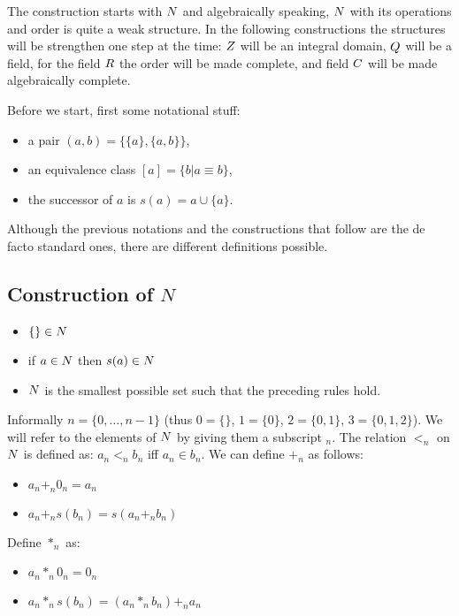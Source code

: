 The construction starts with $N$ and algebraically speaking, $N$ with its
operations and order is quite a weak structure. In the following constructions
the structures will be strengthen one step at the time: $Z$ will be an
integral domain, $Q$ will be a field, for the field $R$ the order will be
made complete, and field $C$ will be made algebraically complete.
%
%

Before we start, first some notational stuff:
\begin{itemize}
\item a pair $(a,b) = \{\{a\},\{a,b\}\}$,
\item an equivalence class $[a] = \{b | a \equiv b\}$,
\item the successor of $a$ is $s(a) = a \cup \{a\}$.
\end{itemize}
Although the previous notations and the constructions that follow are the de
facto standard ones, there are different definitions possible.

\subsection{Construction of \sl $N$}

\begin{itemize}
\item $\{\} \in N$
\item if $a \in N$ then $s(a) \in N$
\item $N$ is the smallest possible set such that the preceding rules hold.
\end{itemize}
Informally $n=\{0,\ldots,n-1\}$ (thus $0=\{\}$, $1=\{0\}$, $2=\{0,1\}$,
$3=\{0,1,2\}$). We will refer to the elements of $N$ by giving them a
subscript $_n$. The relation $<_n$ on $N$ is defined as: $a_n <_n b_n$ iff
$a_n \in b_n$. We can define $+_n$ as follows:
\begin{itemize}
\item $a_n +_n 0_n = a_n$
\item $a_n +_n s(b_n) = s(a_n +_n b_n)$
\end{itemize}
Define $*_n$ as:
\begin{itemize}
\item $a_n *_n 0_n = 0_n$
\item $a_n *_n s(b_n) = (a_n *_n b_n) +_n a_n$
\end{itemize}

